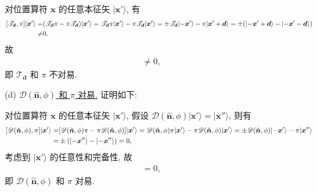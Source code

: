 \documentclass{assignment}
\begin{document}
\begin{sol}
\begin{itemize}
        对位置算符 $\bm{x}$ 的任意本征矢 $\lvert\bm{x}'\rangle$, 有
        \begin{align}
            \notag[\mathscr{T}_{\bm{d}},\pi]\lvert\bm{x}'\rangle=&(\mathscr{T}_{\bm{d}}\pi-\pi\mathscr{T}_{\bm{d}})\lvert\bm{x}'\rangle=\mathscr{T}_{\bm{d}}\pi\lvert\bm{x}'\rangle-\pi\mathscr{T}_{\bm{d}}\lvert\bm{x}'\rangle=\pm\mathscr{T}_{\bm{d}}\lvert-\bm{x}'\rangle-\pi\lvert\bm{x}'+\bm{d}\rangle=\pm(\lvert-\bm{x}'+\bm{d}\rangle-\lvert-\bm{x}'-\bm{d}\rangle)\\
            \neq&0,
        \end{align}
        故
        \begin{align}
            [\mathscr{T}_{\bm{d}},\pi]\neq 0,
        \end{align}
        即 $\mathscr{T}_{\bm{d}}$ 和 $\pi$ 不对易.
        \item[(d)] \uline{$\mathscr{D}(\hat{\bm{n}},\phi)$ 和 $\pi$ 对易.} 证明如下:

        对位置算符 $\bm{x}$ 的任意本征矢 $\lvert\bm{x}'\rangle$, 假设 $\mathscr{D}(\hat{\bm{n}},\phi)\lvert\bm{x}'\rangle=\lvert\bm{x}''\rangle$, 则有
        \begin{align}
            \notag[\mathscr{D}(\hat{\bm{n}},\phi),\pi]\lvert\bm{x}'\rangle=&[\mathscr{D}(\hat{\bm{n}},\phi)\pi-\pi\mathscr{D}(\hat{\bm{n}},\phi)]\lvert\bm{x}'\rangle=\mathscr{D}(\hat{\bm{n}},\phi)\pi\lvert\bm{x}'\rangle-\pi\mathscr{D}(\hat{\bm{n}},\phi)\lvert\bm{x}'\rangle=\pm\mathscr{D}(\hat{\bm{n}},\phi)\lvert-\bm{x}'\rangle-\pi\lvert\bm{x}''\rangle\\
            =&\pm(\lvert-\bm{x}''\rangle-\lvert-\bm{x}''\rangle)=0,
        \end{align}
        考虑到 $\lvert\bm{x}'\rangle$ 的任意性和完备性, 故
        \begin{align}
            [\mathscr{D}(\hat{\bm{n}},\phi),\pi]=0,
        \end{align}
        即 $\mathscr{D}(\hat{\bm{n}},\phi)$ 和 $\pi$ 对易.
    \end{itemize}
\end{sol}
\end{document}
